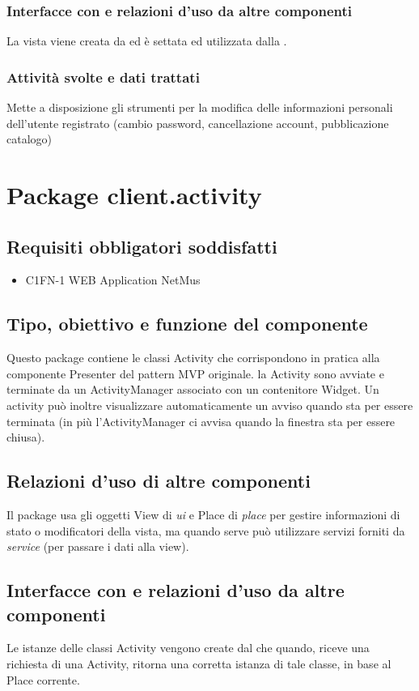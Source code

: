 \subsubsection*{Interfacce con e relazioni d'uso da altre componenti}
La vista viene creata da  ed \`e settata ed utilizzata dalla
.
\subsubsection*{Attivit\`a svolte e dati trattati}
Mette a disposizione gli strumenti per la modifica delle informazioni personali
dell'utente registrato (cambio password, cancellazione account,
pubblicazione catalogo)

\newpage
\section{Package client.activity} %
\subsection*{Requisiti obbligatori soddisfatti}
\begin{itemize}
	\item C1FN-1 WEB Application NetMus
\end{itemize}
\subsection*{Tipo, obiettivo e funzione del componente}
Questo package contiene le classi Activity che corrispondono in pratica alla
componente Presenter del pattern MVP originale. la Activity sono avviate e
terminate da un ActivityManager associato con un contenitore Widget. Un activity
pu\`o inoltre visualizzare automaticamente un avviso quando sta per essere
terminata (in pi\`u l'ActivityManager ci avvisa quando la finestra sta per
essere chiusa).

\subsection*{Relazioni d'uso di altre componenti} Il package usa gli oggetti
View di \emph{ui} e Place di \emph{place} per gestire informazioni di stato o
modificatori della vista, ma quando serve pu\`o utilizzare servizi forniti da
\emph{service} (per passare i dati alla view).
\subsection*{Interfacce con e relazioni d'uso da altre componenti} Le istanze
delle classi Activity vengono create dal  che quando,
riceve una richiesta di una Activity, ritorna una corretta istanza di tale
classe, in base al Place corrente.
